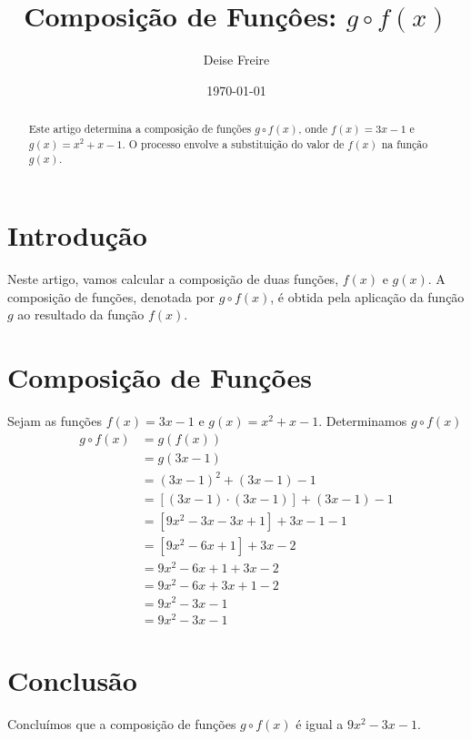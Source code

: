 \documentclass[12pt,a4paper]{article}
\begin{document}
\title{Composição de Funçôes: $g \circ f\left( x \right)$}
\author{Deise Freire}
\date{\today}
\maketitle
\begin{abstract}
    Este artigo determina a composição de funções $g \circ f\left( x \right)$, onde $f\left( x \right) = 3x - 1$ e $g\left( x \right) = x^{2} + x - 1$. O processo envolve a substituição do valor de $f\left( x \right)$ na função $g\left( x \right)$.
\end{abstract}
\section{Introdução}
Neste artigo, vamos calcular a composição de duas funções, $f\left( x \right)$ e $g\left( x \right)$. A composição de funções, denotada por $g \circ f\left( x \right)$, é obtida pela aplicação da função $g$ ao resultado da função $f\left( x \right)$.
\section{Composição de Funções}
Sejam as funções $f\left( x \right) = 3x - 1$ e $g\left( x \right) = x^{2} + x - 1$. Determinamos $g \circ f\left( x \right)$
\begin{align*}
    g \circ f\left( x \right) &= g\left( f\left( x \right) \right) \\
    &= g\left( 3x - 1 \right) \\
    &= \left( 3x - 1 \right)^{2} + \left( 3x - 1 \right) - 1 \\
    &= \left[ \left( 3x - 1 \right) \cdot \left( 3x - 1 \right) \right] + \left( 3x - 1 \right) - 1 \\
    &= \left[ 9x^{2} - 3x - 3x + 1 \right] + 3x - 1 - 1 \\
    &= \left[ 9x^{2} - 6x + 1 \right] + 3x - 2 \\
    &= 9x^{2} - 6x + 1 + 3x - 2 \\
    &= 9x^{2} - 6x + 3x + 1 - 2 \\
    &= 9x^{2} - 3x - 1 \\
    &= \boxed{9x^{2} - 3x - 1} 
\end{align*}
\section{Conclusão}
Concluímos que a composição de funções $g \circ f\left( x \right)$ é igual a $9x^{2} - 3x - 1$.
\end{document}
